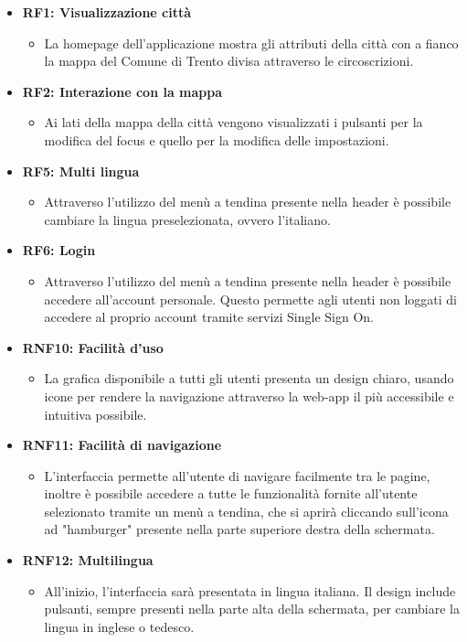     \begin{itemize}
        \item \textbf{RF1: Visualizzazione città} \begin{itemize}
            \item La homepage dell'applicazione mostra gli attributi della città con a fianco la mappa del Comune di Trento divisa attraverso le circoscrizioni.
        \end{itemize}
        \item \textbf{RF2: Interazione con la mappa} \begin{itemize} 
            \item Ai lati della mappa della città vengono visualizzati i pulsanti per la modifica del focus e quello per la modifica delle impostazioni.
        \end{itemize}
        \item \textbf{RF5: Multi lingua} \begin{itemize} 
            \item Attraverso l'utilizzo del menù a tendina presente nella header è possibile cambiare la lingua preselezionata, ovvero l'italiano.
        \end{itemize}
        \item \textbf{RF6: Login} \begin{itemize} 
            \item Attraverso l'utilizzo del menù a tendina presente nella header è possibile accedere all'account personale. Questo permette agli utenti non loggati di accedere al proprio account tramite servizi Single Sign On.
        \end{itemize}
        \item \textbf{RNF10: Facilità d'uso} \begin{itemize}
                \item La grafica disponibile a tutti gli utenti presenta un design chiaro, usando icone per rendere la navigazione attraverso la web-app il più accessibile e intuitiva possibile.
        \end{itemize}
        \item \textbf{RNF11: Facilità di navigazione} \begin{itemize}
            \item L'interfaccia permette all'utente di navigare facilmente tra le pagine, inoltre è possibile accedere a tutte le funzionalità fornite all'utente selezionato tramite un menù a tendina, che si aprirà cliccando sull'icona ad "hamburger" presente nella parte superiore destra della schermata.
        \end{itemize}
        \item \textbf{RNF12: Multilingua} \begin{itemize} 
            \item All'inizio, l'interfaccia sarà presentata in lingua italiana. Il design include pulsanti, sempre presenti nella parte alta della schermata, per cambiare la lingua in inglese o tedesco.
        \end{itemize}
    \end{itemize}


